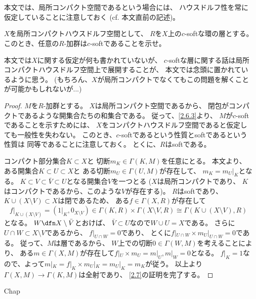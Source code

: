 \documentclass[uplatex,dvipdfmx]{jsarticle}
\begin{document}
\maketitle
\HeaderCommentA
\section{}

本文では、局所コンパクト空間であるという場合には、
ハウスドルフ性を常に仮定していることに注意しておく
(cf. 本文\cite[Proposition 2.5.1]{kashiwara2002sheaves}直前の記述)。
\fi

\begin{prob}\label{2.7}
  \(X\)を局所コンパクトハウスドルフ空間として、
  \(R\)を\(X\)上の\(c\)-softな環の層とする。
  このとき、任意の\(R\)-加群は\(c\)-softであることを示せ。
\end{prob}

\begin{rem*}
  本文では\(X\)に関する仮定が何も書かれていないが、
  \(c\)-softな層に関する話は局所コンパクトハウスドルフ空間上で展開することが、
  本文では念頭に置かれているように思う。
  (もちろん、\(X\)が局所コンパクトでなくてもこの問題を解くことが可能かもしれないが...)
\end{rem*}

\begin{proof}
  \(M\)を\(R\)-加群とする。
  \(X\)は局所コンパクト空間であるから、
  閉包がコンパクトであるような開集合たちの和集合である。
  従って、\autoref{2.6.3}より、
  \(M\)が\(c\)-softであることを示すためには、
  \(X\)をコンパクトハウスドルフ空間であると仮定しても一般性を失わない。
  このとき、\(c\)-softであるという性質とsoftであるという性質は
  同等であることに注意しておく。
  とくに、\(R\)はsoftである。

  コンパクト部分集合\(K\subset X\)と
  切断\(m_K\in \Gamma(K,M)\)を任意にとる。
  本文\cite[Proposition 2.5.1 (ii)]{kashiwara2002sheaves}より、
  ある開集合\(K\subset U\subset X\)と
  ある切断\(m_U\in \Gamma(U,M)\)が存在して、
  \(m_K=m_U|_K\)となる。
  \(K\subset V \subset \bar{V}\subset U\)となる開集合\(V\)を一つとる
  (\(X\)は局所コンパクトであり、
  \(K\)はコンパクトであるから、このような\(V\)が存在する)。
  \(R\)はsoftであり、
  \(K\cup (X\setminus V)\subset X\)は閉であるため、
  ある\(f\in \Gamma(X,R)\)が存在して
  \[
  f|_{K\cup (X\setminus V)} = (1|_K,0_{X\setminus V})
  \in \Gamma(K,R) \times \Gamma(X\setminus V,R)
  \cong \Gamma(K\cup (X\setminus V), R)
  \]
  となる。
  \(W\dfn X\setminus \bar{V}\)とおけば、
  \(\bar{V}\subset U\)なので\(W\cup U = X\)である。
  さらに\(U\cap W\subset X\setminus V\)であるから、
  \(f|_{U\cap W} = 0\)であり、
  とくに\(f|_{U\cap W} \times m_U|_{U\cap W} = 0\)である。
  従って、\(M\)は層であるから、
  \(W\)上での切断\(0\in \Gamma(W,M)\)を考えることにより、
  ある\(m\in \Gamma(X,M)\)が存在して\(f|_U\times m_U = m|_U, m|_W=0\)となる。
  \(f|_K=1\)なので、よって\(m|_K = f|_K\times m_U|_K = m_U|_K = m_K\)が従う。
  以上より\(\Gamma(X,M)\to \Gamma(K,M)\)は全射であり、
  \autoref{2.7}の証明を完了する。
\end{proof}






\ifcsname Chap\endcsname\else
\printbibliography
\end{document}
